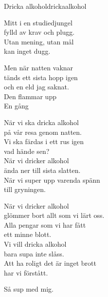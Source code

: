 \newpage

\begin{song}{Dricka alkohol}{drickaalkohol}
\begin{vers}
Mitt i en studiedjungel\\
fylld av krav och plugg.\\
Utan mening, utan mål\\
kan inget dugg.\\
\end{vers}
\begin{vers}
Men när natten vaknar\\
tänds ett sista hopp igen\\
och en eld jag saknat.\\
Den flammar upp\\
En gång\\
\end{vers}
\begin{vers}
När vi ska dricka alkohol\\
på vår resa genom natten.\\
Vi ska färdas i ett rus igen\\
vad hände sen?\\
När vi dricker alkohol\\
ända ner till sista slatten.\\
När vi super upp varenda spänn\\
till gryningen.\\
\end{vers}
\begin{vers}
När vi dricker alkohol\\
glömmer bort allt som vi lärt oss.\\
Alla pengar som vi har fått\\
ett minne blott.\\
Vi vill dricka alkohol\\
bara supa inte slåss.\\
Att ha roligt det är inget brott\\
har vi förstått.\\
\end{vers}
\begin{vers}
Så sup med mig.\\
\end{vers}
\end{song}


